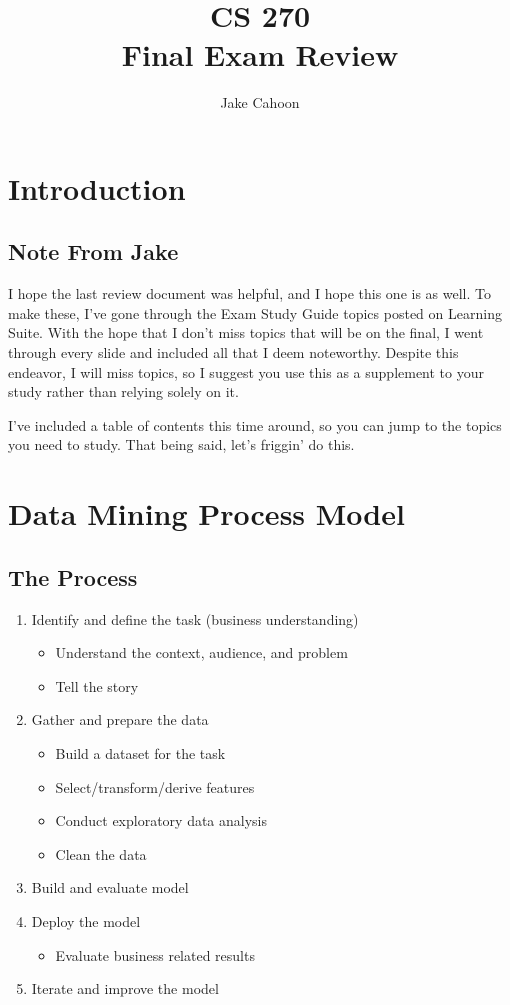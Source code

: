 \documentclass[10pt]{report}
\title{\Huge{CS 270}\\Final Exam Review}
\author{\huge{Jake Cahoon}}
\date{}
\begin{document}
\maketitle
\newpage
{}
\renewcommand{\contentsname}{Table of Contents}
\tableofcontents
\pagebreak

\chapter{Introduction}
\section{Note From Jake}
I hope the last review document was helpful, and I hope this one is as well. To make these, I've gone through the Exam Study Guide topics posted on Learning Suite. With the hope that I don't miss topics that will be on the final, I went through every slide and included all that I deem noteworthy. Despite this endeavor, I will miss topics, so I suggest you use this as a supplement to your study rather than relying solely on it.

I've included a table of contents this time around, so you can jump to the topics you need to study. That being said, let's friggin' do this.

\pagebreak

\chapter{Data Mining Process Model}
\section{The Process}
\begin{enumerate}
  \item Identify and define the task (business understanding)
    \begin{itemize}
      \item Understand the context, audience, and problem
      \item Tell the story
    \end{itemize}
  \item Gather and prepare the data
    \begin{itemize}
      \item Build a dataset for the task
      \item Select/transform/derive features
      \item Conduct exploratory data analysis
      \item Clean the data
    \end{itemize}
  \item Build and evaluate model
  \item Deploy the model
    \begin{itemize}
      \item Evaluate business related results
    \end{itemize}
  \item Iterate and improve the model
\end{enumerate}
\end{document}
